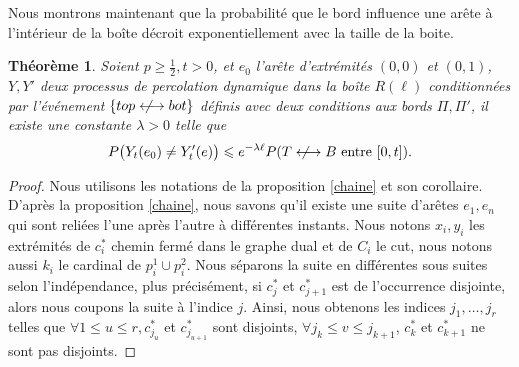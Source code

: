 \documentclass[titlepage,a4paper,12pt]{article}
\newcounter{thm}
\newcounter{prop}
\newcounter{cor}
\newtheorem{cvg}[thm]{Théorème}
\newcommand{\nlongleftrightarrow}{\longleftrightarrow \kern-15pt\not \kern15pt}
\begin{document}
Nous montrons maintenant que la probabilité que le bord influence une arête à l'intérieur de la boîte décroit exponentiellement avec la taille de la boite. 
\begin{cvg}
Soient $p\geqslant \frac{1}{2}, t> 0$, et $e_0$ l'arête d'extrémités $(0,0)$ et $(0,1)$, $Y,Y'$ deux processus de percolation dynamique dans la boîte $R(\ell)$ conditionnées par l'événement $\{top \nlongleftrightarrow bot\}$ définis avec deux conditions aux bords $\Pi, \Pi'$, il existe une constante $\lambda> 0$ telle que $$P\big(Y_t(e_0)\neq Y'_t(e)\big) \leqslant e^{-\lambda \ell} P(T\nlongleftrightarrow B \text{ entre }[0,t]).$$
\end{cvg}

\begin{proof}

Nous utilisons les notations de la proposition \ref{chaine} et son corollaire.
D'après la proposition \ref{chaine}, nous savons qu'il existe une suite d'arêtes $e_1,e_n$ qui sont reliées l'une après l'autre à différentes instants. Nous notons $x_i,y_i$ les extrémités de $c_i^*$ chemin fermé dans le graphe dual et de $C_i$ le cut, nous notons aussi $k_i$ le cardinal de $p_i^1\cup p_i^2$. Nous séparons la suite en différentes sous suites selon l'indépendance, plus précisément, si $c^*_j$ et $c^*_{j+1}$  est de l'occurrence disjointe, alors nous coupons la suite à l'indice $j$. Ainsi, nous obtenons les indices $j_1,\dots,j_r$ telles que $\forall 1\leqslant u\leqslant r, c^*_{j_u}$ et $c^*_{j_{u+1}}$ sont disjoints, $\forall j_k \leqslant v \leqslant j_{k+1}$, $c_k^*$ et $c_{k+1}^*$ ne sont pas disjoints.


\end{proof}
\end{document}
